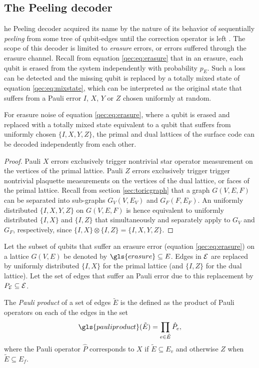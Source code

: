 \subsection{The Peeling decoder}
he Peeling decoder acquired its name by the nature of its behavior of sequentially \emph{peeling} from some tree of qubit-edges until the correction operator is left \cite{delfosse2017linear}. The scope of this decoder is limited to \emph{erasure} errors, or errors suffered through the erasure channel. Recall from equation \eqref{qec:eq:erasure} that in an erasure, each qubit is erased from the system independently with probability $p_E$. Such a loss can be detected and the missing qubit is replaced by a totally mixed state of equation \eqref{qec:eq:mixstate}, which can be interpreted as the original state that suffers from a Pauli error $I$, $X$, $Y$ or $Z$ chosen uniformly at random.
\begin{theorem}\label{the:independentxy}
  For erasure noise of equation \eqref{qec:eq:erasure}, where a qubit is erased and replaced with a totally mixed state equivalent to a qubit that suffers from uniformly chosen $\{I,X,Y,Z\}$, the primal and dual lattices of the surface code can be decoded independently from each other.
\end{theorem}
\begin{proof}
  Pauli $X$ errors exclusively trigger nontrivial star operator measurement on the vertices of the primal lattice. Pauli $Z$ errors exclusively trigger trigger nontrivial plaquette measurements on the vertices of the dual lattice, or faces of the primal lattice. Recall from section \ref{sec:toricgraph} that a graph $G(V,E,F)$ can be separated into sub-graphs $G_{V}(V,E_V)$ and $G_{F}(F,E_F)$. An uniformly distributed $\{I,X,Y,Z\}$ on $G(V,E,F)$ is hence equivalent to uniformly distributed $\{I,X\}$ and $\{I,Z\}$ that simultaneously and separately apply to $G_{V}$ and $G_{F}$, respectively, since $\{I,X\} \otimes \{I,Z\}=\{I,X,Y,Z\}$.
\end{proof}
\begin{definition}\label{def:erasure}
  Let the subset of qubits that suffer an erasure error (equation \eqref{qec:eq:erasure}) on a lattice $G(V,E)$ be denoted by $\gls{erasure}\subseteq E$. Edges in $\mathcal{E}$ are replaced by uniformly distributed $\{I,X\}$ for the primal lattice (and $\{I,Z\}$ for the dual lattice). Let the set of edges that suffer an Pauli error due to this replacement by $P_{\mathcal{E}}\subseteq \mathcal{E}$.
\end{definition}
\begin{definition}\label{def:pauliprod}
  The \emph{Pauli product} of a set of edges $\tilde{E}$ is the defined as the product of Pauli operators on each of the edges in the set
  \begin{equation}\label{eq:pauliprod}
    \gls{pauliproduct}(\tilde{E}) = \prod_{e\in \tilde{E}} \hat{P}_e,
  \end{equation}
  where the Pauli operator $\hat{P}$ corresponds to $X$ if $\tilde{E}\subseteq E_v$ and otherwise $Z$ when $\tilde{E}\subseteq E_f$.
\end{definition}

